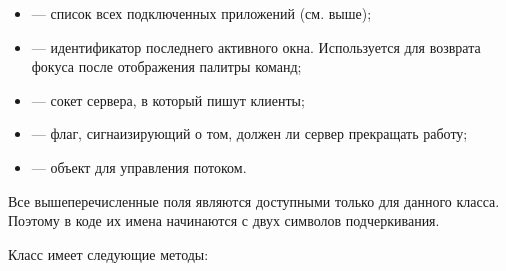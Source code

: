 \begin{itemize}
    \item {} — список всех подключенных приложений (см.
         выше);
    \item {} — идентификатор последнего активного окна.
        Используется для возврата фокуса после отображения палитры команд;
    \item {} — сокет сервера, в который пишут клиенты;
    \item {} — флаг, сигнаизирующий о том, должен ли сервер
        прекращать работу;
    \item {} — объект для управления потоком.
\end{itemize}

Все вышеперечисленные поля являются доступными только для данного класса.
Поэтому в коде их имена начинаются с двух символов подчеркивания.

Класс  имеет следующие методы:

